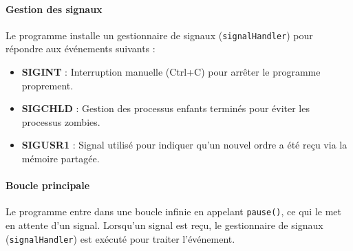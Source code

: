 \documentclass[a4paper, 11pt, french]{article}
\begin{document}
\paragraph{Gestion des signaux}
Le programme installe un gestionnaire de signaux (\texttt{signalHandler}) pour répondre aux événements suivants :
\begin{itemize}
    \item \textbf{SIGINT} : Interruption manuelle (Ctrl+C) pour arrêter le programme proprement.
    \item \textbf{SIGCHLD} : Gestion des processus enfants terminés pour éviter les processus zombies.
    \item \textbf{SIGUSR1} : Signal utilisé pour indiquer qu'un nouvel ordre a été reçu via la mémoire partagée.
\end{itemize}

\paragraph{Boucle principale}
Le programme entre dans une boucle infinie en appelant \texttt{pause()}, ce qui le met en attente d'un signal. Lorsqu'un signal est reçu, le gestionnaire de signaux (\texttt{signalHandler}) est exécuté pour traiter l'événement.
\end{document}
